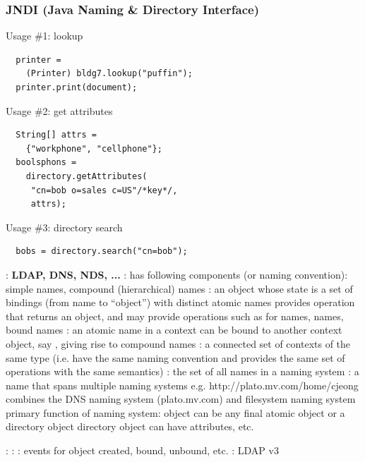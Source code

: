\documentclass{myproc}
\begin{document}
\subsubsection{JNDI (Java Naming \& Directory Interface)}
\bit
\w Usage \#1: lookup
   \begin{verbatim}
  printer = 
    (Printer) bldg7.lookup("puffin");
  printer.print(document);
\end{verbatim}
\w Usage \#2: get attributes
  \begin{verbatim}
  String[] attrs = 
    {"workphone", "cellphone"};
  boolsphons = 
    directory.getAttributes(
     "cn=bob o=sales c=US"/*key*/, 
     attrs);
 \end{verbatim}
\w Usage \#3: directory search
  \begin{verbatim}
  bobs = directory.search("cn=bob");
\end{verbatim}
\w {}: {\bf LDAP, DNS, NDS, ...}
\w {}: has following components
   \bit
   \w {} (or naming convention): simple names, compound
   (hierarchical) names
   \w {}: an object whose state is a set of bindings (from name to ``object'') with distinct atomic names
     \bit
     \w provides  operation that returns an object,
     and may provide operations such as for  names,
      names,   bound names
     \w {}: an atomic name in a context can be bound to another
     context object, say , giving rise to compound names
     \eit
   \w {}: a connected set of contexts of the same type
   (i.e. have the same naming convention and provides the same set of
   operations with the same semantics)
   \w {}: the set of all names in a naming system
   \w {}: a name that spans multiple naming systems
      e.g. http://plato.mv.com/home/cjeong combines the DNS naming system
      (plato.mv.com) and  filesystem naming system
   \eit
\w {}
\bit
\w  primary function of naming system:  
  \bit
  \w object can be any final atomic object or a directory object
  \eit
\w directory object can have attributes, etc.
\eit

\w {}
\bit
\w {}:
\w {}:
\w {}: events for object created, bound, unbound, etc.
\w {}: LDAP v3
\eit
\end{document}
